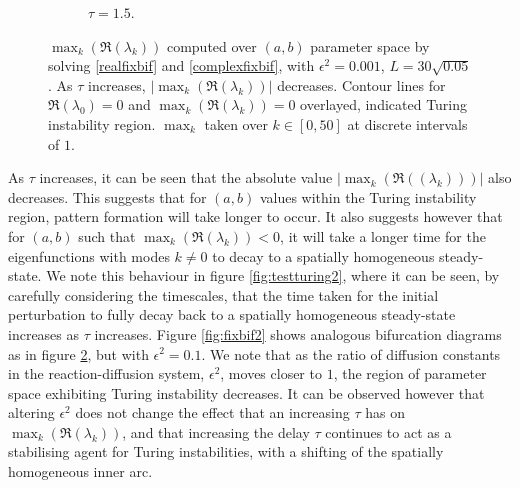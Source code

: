 \begin{figure}[H]
\begin{subfigure}[b]{0.45\textwidth}
        \caption{$\tau=1.5$.}
        \label{}
    \end{subfigure}
    \caption{$\max_k(\Re(\lambda_k))$ computed over $(a,b)$ parameter space by solving \eqref{realfixbif} and \eqref{complexfixbif}, with $\epsilon^2=0.001$, $L=30\sqrt{0.05}$. As $\tau$ increases, $|\max_k(\Re(\lambda_k))|$ decreases. Contour lines for $\Re(\lambda_0)=0$ and $\max_k(\Re(\lambda_k))=0$ overlayed, indicated Turing instability region. $\max_k$ taken over $k\in[0, 50]$ at discrete intervals of $1$.}
    \label{fig:lambdavary}
\end{figure}
As $\tau$ increases, it can be seen that the absolute value $|\max_k(\Re((\lambda_k)))|$ also decreases. This suggests that for $(a,b)$ values within the Turing instability region, pattern formation will take longer to occur. It also suggests however that for $(a,b)$ such that $\max_k(\Re(\lambda_k))<0$, it will take a longer time for the eigenfunctions with modes $k\neq0$ to decay to a spatially homogeneous steady-state. We note this behaviour in figure \ref{fig:testturing2}, where it can be seen, by carefully considering the timescales, that the time taken for the initial perturbation to fully decay back to a spatially homogeneous steady-state increases as $\tau$ increases. Figure \ref{fig:fixbif2} shows analogous bifurcation diagrams as in figure \ref{fig:lambdavary}, but with $\epsilon^2=0.1$. We note that as the ratio of diffusion constants in the reaction-diffusion system, $\epsilon^2$, moves closer to $1$, the region of parameter space exhibiting Turing instability decreases. It can be observed however that altering $\epsilon^2$ does not change the effect that an increasing $\tau$ has on $\max_k(\Re(\lambda_k))$, and that increasing the delay $\tau$ continues to act as a stabilising agent for Turing instabilities, with a shifting of the spatially homogeneous inner arc.

